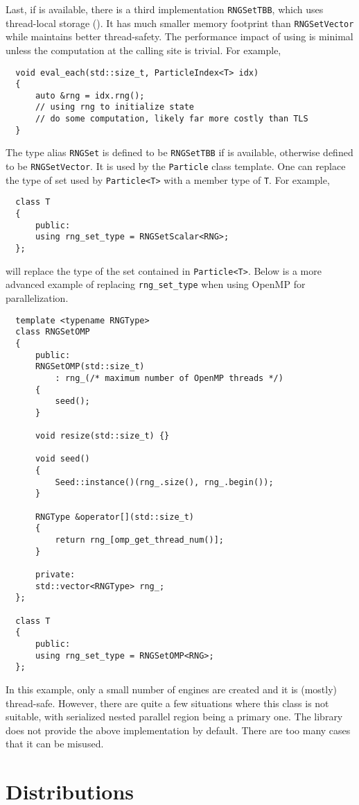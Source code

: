 Last, if \tbb is available, there is a third implementation \verb|RNGSetTBB|,
which uses thread-local storage (\tls). It has much smaller memory footprint
than \verb|RNGSetVector| while maintains better thread-safety. The performance
impact of using \tls is minimal unless the computation at the calling site is
trivial. For example,
\begin{Verbatim}
  void eval_each(std::size_t, ParticleIndex<T> idx)
  {
      auto &rng = idx.rng();
      // using rng to initialize state
      // do some computation, likely far more costly than TLS
  }
\end{Verbatim}
The type alias \verb|RNGSet| is defined to be \verb|RNGSetTBB| if \tbb is
available, otherwise defined to be \verb|RNGSetVector|. It is used by the
\verb|Particle| class template. One can replace the type of \rng set used by
\verb|Particle<T>| with a member type of \verb|T|. For example,
\begin{Verbatim}
  class T
  {
      public:
      using rng_set_type = RNGSetScalar<RNG>;
  };
\end{Verbatim}
will replace the type of the \rng set contained in \verb|Particle<T>|. Below is
a more advanced example of replacing \verb|rng_set_type| when using OpenMP for
parallelization.
\begin{Verbatim}
  template <typename RNGType>
  class RNGSetOMP
  {
      public:
      RNGSetOMP(std::size_t)
          : rng_(/* maximum number of OpenMP threads */)
      {
          seed();
      }

      void resize(std::size_t) {}

      void seed()
      {
          Seed::instance()(rng_.size(), rng_.begin());
      }

      RNGType &operator[](std::size_t)
      {
          return rng_[omp_get_thread_num()];
      }

      private:
      std::vector<RNGType> rng_;
  };

  class T
  {
      public:
      using rng_set_type = RNGSetOMP<RNG>;
  };
\end{Verbatim}
In this example, only a small number of \rng{} engines are created and it is
(mostly) thread-safe. However, there are quite a few situations where this
class is not suitable, with serialized nested parallel region being a primary
one. The library does not provide the above implementation by default. There
are too many cases that it can be misused.

\section{Distributions}
\label{sec:Distributions}

